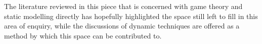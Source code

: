 \documentclass[11pt]{article}
\newcommand*{\np}{\par\noindent\newline}
\begin{document}
\np The literature reviewed in this piece that is concerned with game theory and static modelling directly has hopefully
highlighted the space still left to fill in this area of enquiry, while the discussions of dynamic techniques are offered as a method by which this space can be contributed to.
 
\newpage


\end{document}
